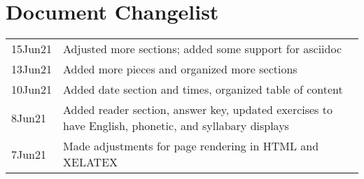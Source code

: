 \chapter{Document Changelist}
\begin{tabular}{p{3cm} p{11cm}}
15Jun21 & Adjusted more sections; added some support for asciidoc\\
13Jun21 & Added more pieces and organized more sections \\
10Jun21 & Added date section and times, organized table of content\\
8Jun21 & Added reader section, answer key, updated exercises to have English, phonetic, and syllabary displays \\
7Jun21 & Made adjustments for page rendering in HTML and XELATEX
\end{tabular}